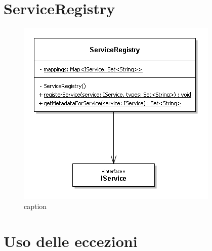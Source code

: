 \section{ServiceRegistry}
\label{sec:P-serviceregistry}
\begin{figure} [h]
	\includegraphics[width=\linewidth]{pictures/ServiceRegistry.png}
	\caption{caption}
	\label{fig:ServiceRegistry}
\end{figure}

\section{Uso delle eccezioni}